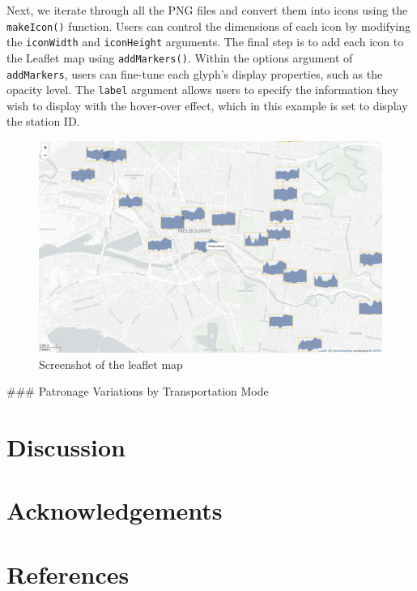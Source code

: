Next, we iterate through all the PNG files and convert them into icons using the \texttt{makeIcon()} function. Users can control the dimensions of each icon by modifying the \texttt{iconWidth} and \texttt{iconHeight} arguments. The final step is to add each icon to the Leaflet map using \texttt{addMarkers()}. Within the options argument of \texttt{addMarkers}, users can fine-tune each glyph's display properties, such as the opacity level. The \texttt{label} argument allows users to specify the information they wish to display with the hover-over effect, which in this example is set to display the station ID.

\begin{figure}
\includegraphics[width=41.28in]{figures/leaflet-screenshot} \caption{Screenshot of the leaflet map}\label{fig:unnamed-chunk-25}
\end{figure}

\#\#\# Patronage Variations by Transportation Mode

\section{Discussion}\label{discussion}

\section{Acknowledgements}\label{acknowledgements}

\section*{References}\label{references}

